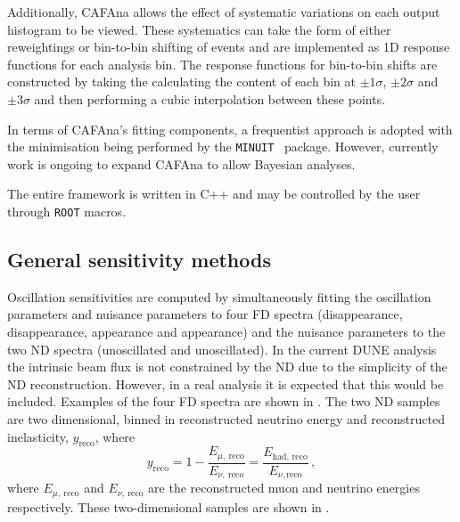 Additionally, CAFAna allows the effect of systematic variations on each output histogram to be viewed. 
These systematics can take the form of either reweightings or bin-to-bin shifting of events and are implemented as 1D response functions for each analysis bin.
The response functions for bin-to-bin shifts are constructed by taking the calculating the content of each bin at $\pm 1 \sigma$, $\pm 2 \sigma$ and $\pm 3 \sigma$ and then performing a cubic interpolation between these points.

In terms of CAFAna's fitting components, a frequentist approach is adopted with the minimisation being performed by the \texttt{MINUIT}~\cite{minuit} package.
However, currently work is ongoing to expand CAFAna to allow Bayesian analyses.

The entire framework is written in C++ and may be controlled by the user through \texttt{ROOT} macros.

\subsection{General sensitivity methods}
\label{sec:dune_lbl:sensitivities:general}

Oscillation sensitivities are computed by simultaneously fitting the oscillation parameters and nuisance parameters to four FD spectra (\numu disappearance, \anumu disappearance, \nue appearance and \anue appearance) and the nuisance parameters to the two ND spectra (\numu unoscillated and \anumu unoscillated). 
In the current DUNE analysis the intrinsic \nue beam flux is not constrained by the ND due to the simplicity of the ND reconstruction.
However, in a real analysis it is expected that this would be included.
Examples of the four FD spectra are shown in .
The two ND samples are two dimensional, binned in reconstructed neutrino energy and reconstructed inelasticity, $y_{\text{reco}}$, where
\begin{equation}
	y_{\text{reco}} = 1 - \frac{E_{\mu,~\text{reco}}}{E_{\nu,~\text{reco}}} = \frac{E_{\text{had, reco}}}{E_{\nu, \text{reco}}} \, ,
\end{equation}
where $E_{\mu,~\text{reco}}$ and $E_{\nu,~\text{reco}}$ are the reconstructed muon and neutrino energies respectively.
These two-dimensional samples are shown in .


